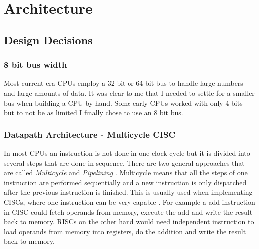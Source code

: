 \chapter{\gls{Architecture}}\label{cha:architecture}

\section{Design Decisions}

\subsection{8 bit bus width}
Most current era \glspl{CPU} employ a 32 bit or 64 bit bus to handle large numbers and large amounts of data.
It was clear to me that I needed to settle for a smaller bus when building a \gls{CPU} by hand.
Some early \glspl{CPU} worked with only 4 bits but to not be as limited I finally chose to use an 8 bit bus.
\subsection{Datapath Architecture - Multicycle CISC}
In most \glspl{CPU} an instruction is not done in one clock cycle but it is divided into several steps that are done in sequence.
There are two general approaches that are called \emph{Multicycle} and \emph{Pipelining} \cite{PattersonDavid2016RuRD}.
Multicycle means that all the steps of one instruction are performed sequentially and a new instruction is only dispatched after the previous instruction is finished.
This is usually used when implementing \glspl{CISC}, where one instruction can be very capable \cite{chen_novick_shimano_2000}.
For example a add instruction in \gls{CISC} could fetch operands from memory, execute the add and write the result back to memory.
\glspl{RISC} on the other hand would need independent instruction to load operands from memory into registers, do the addition and write the result back to memory.

